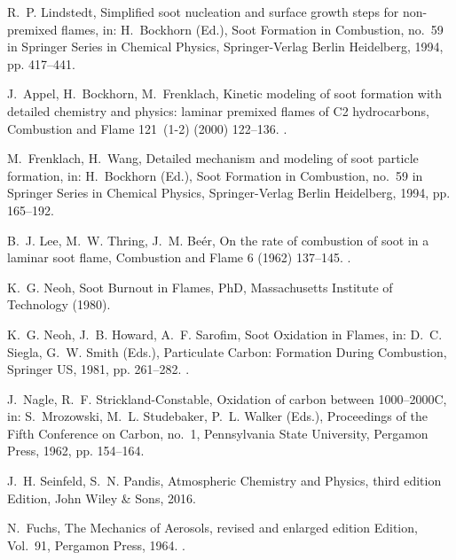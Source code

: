 \documentclass[preprint,letterpaper]{elsarticle}
\begin{document}
\begin{thebibliography}{10}
R.~P. Lindstedt, {Simplified soot nucleation and surface growth steps for
  non-premixed flames}, in: H.~Bockhorn (Ed.), {Soot Formation in Combustion},
  no.~59 in {Springer Series in Chemical Physics}, {Springer-Verlag Berlin
  Heidelberg}, 1994, pp. 417--441.

J.~Appel, H.~Bockhorn, M.~Frenklach, {Kinetic modeling of soot formation with
  detailed chemistry and physics: laminar premixed flames of C2 hydrocarbons},
  {Combustion and Flame} 121~(1-2) (2000) 122--136.
\newblock \href {http://dx.doi.org/10.1016/S0010-2180(99)00135-2}
  {}.

M.~Frenklach, H.~Wang, {Detailed mechanism and modeling of soot particle
  formation}, in: H.~Bockhorn (Ed.), {Soot Formation in Combustion}, no.~59 in
  {Springer Series in Chemical Physics}, {Springer-Verlag Berlin Heidelberg},
  1994, pp. 165--192.

B.~J. Lee, M.~W. Thring, J.~M. Be{\'e}r, {On the rate of combustion of soot in
  a laminar soot flame}, {Combustion and Flame} 6 (1962) 137--145.
\newblock \href {http://dx.doi.org/10.1016/0010-2180(62)90082-2}
  {}.

K.~G. Neoh, {Soot Burnout in Flames}, {PhD}, {Massachusetts Institute of
  Technology} (1980).

K.~G. Neoh, J.~B. Howard, A.~F. Sarofim, {Soot Oxidation in Flames}, in: D.~C.
  Siegla, G.~W. Smith (Eds.), {Particulate Carbon: Formation During
  Combustion}, {Springer US}, 1981, pp. 261--282.
\newblock \href {http://dx.doi.org/10.1007/978-1-4757-6137-5_9}
  {}.

J.~Nagle, R.~F. Strickland-Constable, {Oxidation of carbon between
  1000--2000C}, in: S.~Mrozowski, M.~L. Studebaker, P.~L. Walker (Eds.),
  {Proceedings of the Fifth Conference on Carbon}, no.~1, {Pennsylvania State
  University}, {Pergamon Press}, 1962, pp. 154--164.

J.~H. Seinfeld, S.~N. Pandis, {Atmospheric Chemistry and Physics}, third
  edition Edition, {John Wiley {\&} Sons}, 2016.

N.~Fuchs, {The Mechanics of Aerosols}, revised and enlarged edition Edition,
  Vol.~91, {Pergamon Press}, 1964.
\newblock \href {http://dx.doi.org/10.1002/qj.49709138822}
  {}.


\end{thebibliography}
\end{document}

